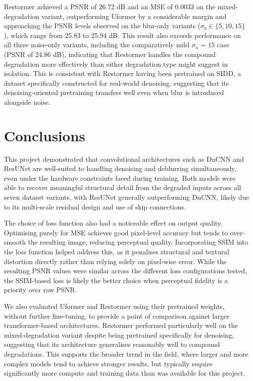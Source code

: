 \documentclass[conference]{IEEEtran}
\begin{document}
Restormer achieved a PSNR of 26.72 dB and an MSE of 0.0033 on the
mixed-degradation variant, outperforming Uformer by a considerable margin
and approaching the PSNR levels observed on the blur-only variants
($\sigma_b \in \{5, 10, 15\}$), which range from 25.83 to 25.94 dB. This
result also exceeds performance on all three noise-only variants,
including the comparatively mild $\sigma_n = 15$ case (PSNR of 24.86 dB),
indicating that Restormer handles the compound degradation more
effectively than either degradation type might suggest in isolation. This
is consistent with Restormer having been pretrained on SIDD, a dataset
specifically constructed for real-world denoising, suggesting that its
denoising-oriented pretraining transfers well even when blur is
introduced alongside noise.


\section{Conclusions}

This project demonstrated that convolutional architectures such as DnCNN
and ResUNet are well-suited to handling denoising and deblurring
simultaneously, even under the hardware constraints faced during
training. Both models were able to recover meaningful structural detail
from the degraded inputs across all seven dataset variants, with ResUNet
generally outperforming DnCNN, likely due to its multi-scale residual
design and use of skip connections.

The choice of loss function also had a noticeable effect on output
quality. Optimising purely for MSE achieves good pixel-level accuracy but
tends to over-smooth the resulting image, reducing perceptual quality.
Incorporating SSIM into the loss function helped address this, as it
penalises structural and textural distortion directly rather than relying
solely on pixel-wise error. While the resulting PSNR values were similar
across the different loss configurations tested, the SSIM-based loss is
likely the better choice when perceptual fidelity is a priority over raw
PSNR.

We also evaluated Uformer and Restormer using their pretrained weights,
without further fine-tuning, to provide a point of comparison against
larger transformer-based architectures. Restormer performed
particularly well on the mixed-degradation variant despite being
pretrained specifically for denoising, suggesting that its architecture
generalises reasonably well to compound degradations. This supports the
broader trend in the field, where larger and more complex models tend
to achieve stronger results, but typically require significantly more
compute and training data than was available for this project.
\end{document}
